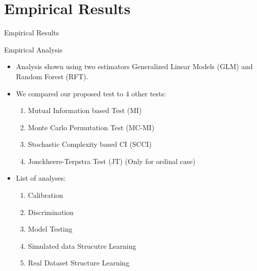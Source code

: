 \documentclass{beamer}
\def\ci{\perp\!\!\!\!\!\perp}
\begin{document}
\section{Empirical Results}
\begin{frame}
	\begin{center} \Huge{Empirical Results} \end{center}
\end{frame}
\begin{frame}{Empirical Analysis}
	\begin{itemize}
		\item Analysis shown using two estimators Generalized Linear Models (GLM) and Random Forest (RFT).
		\item We compared our proposed test to 4 other tests:
			\begin{enumerate}
				\item Mutual Information based Test (MI)
				\item Monte Carlo Permutation Test (MC-MI)
				\item Stochastic Complexity based CI (SCCI)
				\item Jonckheere-Terpstra Test (JT) (Only for ordinal case)
			\end{enumerate}
		\item List of analyses:
			\begin{enumerate}
				\item Calibration
				\item Discrimination
				\item Model Testing
				\item Simulated data Strucutre Learning
				\item Real Dataset Structure Learning
			\end{enumerate}

	\end{itemize}
\end{frame}
\end{document}
